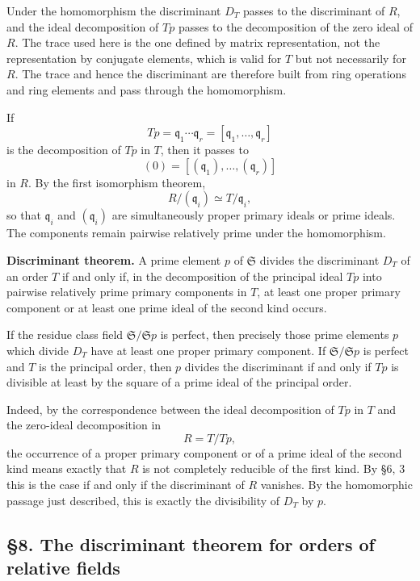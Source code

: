\documentclass[11pt]{article}
\begin{document}
Under the homomorphism the discriminant \(D_T\) passes to the
discriminant of \(R\), and the ideal decomposition of \(Tp\) passes to
the decomposition of the zero ideal of \(R\). The trace used here is the
one defined by matrix representation, not the representation by
conjugate elements, which is valid for \(T\) but not necessarily for
\(R\). The trace and hence the discriminant are therefore built from
ring operations and ring elements and pass through the homomorphism.

If \[
  Tp=\mathfrak q_1\cdots\mathfrak q_r
       =[\mathfrak q_1,
\ldots,
\mathfrak q_r]
\] is the decomposition of \(Tp\) in \(T\), then it passes to \[
  (0)=[(\mathfrak q_1),
\ldots,(
\mathfrak q_r)]
\] in \(R\). By the first isomorphism theorem, \[
  R/(\mathfrak q_i)\simeq T/\mathfrak q_i,
\] so that \(\mathfrak q_i\) and \((\mathfrak q_i)\) are simultaneously
proper primary ideals or prime ideals. The components remain pairwise
relatively prime under the homomorphism.

\textbf{Discriminant theorem.} A prime element \(p\) of \(\mathfrak S\)
divides the discriminant \(D_T\) of an order \(T\) if and only if, in
the decomposition of the principal ideal \(Tp\) into pairwise relatively
prime primary components in \(T\), at least one proper primary component
or at least one prime ideal of the second kind occurs.

If the residue class field \(\mathfrak S/\mathfrak S p\) is perfect,
then precisely those prime elements \(p\) which divide \(D_T\) have at
least one proper primary component. If \(\mathfrak S/\mathfrak S p\) is
perfect and \(T\) is the principal order, then \(p\) divides the
discriminant if and only if \(Tp\) is divisible at least by the square
of a prime ideal of the principal order.

Indeed, by the correspondence between the ideal decomposition of \(Tp\)
in \(T\) and the zero-ideal decomposition in \[
  R=T/Tp,
\] the occurrence of a proper primary component or of a prime ideal of
the second kind means exactly that \(R\) is not completely reducible of
the first kind. By §6, 3 this is the case if and only if the
discriminant of \(R\) vanishes. By the homomorphic passage just
described, this is exactly the divisibility of \(D_T\) by \(p\).

\subsection{§8. The discriminant theorem for orders of relative
fields}\label{the-discriminant-theorem-for-orders-of-relative-fields}
\end{document}

